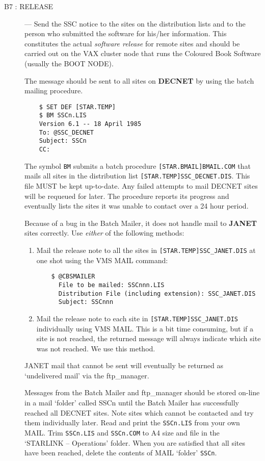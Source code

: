 \begin{description}
\item [B7 : RELEASE] ---
Send the SSC notice to the sites on the distribution lists and to the person
who submitted the software for his/her information.
This constitutes the actual {\em software release} for remote sites and should
be carried out on the VAX cluster node that runs the Coloured Book Software
(usually the BOOT NODE).

The message should be sent to all sites on {\bf DECNET} by using the
batch mailing procedure.

\begin{verbatim}
    $ SET DEF [STAR.TEMP]
    $ BM SSCn.LIS
    Version 6.1 -- 18 April 1985
    To: @SSC_DECNET
    Subject: SSCn
    CC:
\end{verbatim}
The symbol {\tt BM} submits a batch procedure {\tt [STAR.BMAIL]BMAIL.COM}
that mails all sites in the distribution list {\tt [STAR.TEMP]SSC\_DECNET.DIS}.
This file MUST be kept up-to-date.
Any failed attempts to mail DECNET sites will be requeued for later.
The procedure reports its progress and eventually lists the sites it was
unable to contact over a 24 hour period.

Because of a bug in the Batch Mailer, it does not handle mail to {\bf JANET} 
sites correctly. Use {\em either} of the following methods:

\begin{enumerate}
\item Mail the release note to all the sites in {\tt [STAR.TEMP]SSC\_JANET.DIS} 
at one shot using the VMS MAIL command:
\begin{verbatim}
    $ @CBSMAILER
      File to be mailed: SSCnnn.LIS
      Distribution File (including extension): SSC_JANET.DIS
      Subject: SSCnnn
\end{verbatim}
\item Mail the release note to each site in {\tt [STAR.TEMP]SSC\_JANET.DIS}
individually using VMS MAIL.
This is a bit time consuming, but if a site is not reached, the returned
message will always indicate which site was not reached.
We use this method. 
\end{enumerate}

JANET mail that cannot be sent will eventually be returned as `undelivered
mail' via the ftp\_manager.

Messages from the Batch Mailer and ftp\_manager should be stored on-line in a
mail `folder' called SSCn until the Batch Mailer has successfully reached all
DECNET sites. Note sites which cannot be contacted and try them individually 
later. Read and print the {\tt SSCn.LIS} from your own MAIL.
Trim {\tt SSCn.LIS} and {\tt SSCn.COM} to A4 size and file in the 
`STARLINK -- Operations' folder. When you are satisfied that all sites have been
reached, delete the contents of MAIL `folder' {\tt SSCn}.


\end{description}

